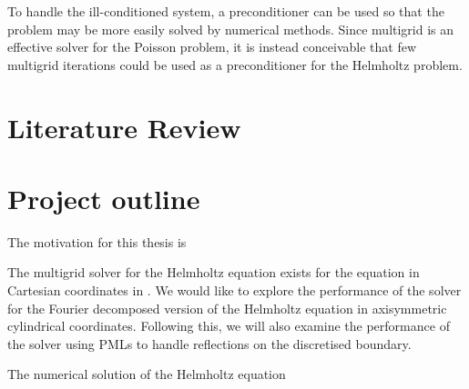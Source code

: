 To handle the ill-conditioned system, a preconditioner can be used so that the problem may be more easily solved by numerical methods.
Since multigrid is an effective solver for the Poisson problem, it is instead conceivable that few multigrid iterations could be used as a preconditioner for the Helmholtz problem.



\section{Literature Review}







\section{Project outline}

\iffalse
What is each chapter doing? What do we hope to accomplish? 
\fi

The motivation for this thesis is 

The multigrid solver for the Helmholtz equation exists for the equation in Cartesian coordinates in \oomph.
We would like to explore the performance of the solver for the Fourier decomposed version of the Helmholtz equation in axisymmetric cylindrical coordinates.
Following this, we will also examine the performance of the solver using PMLs to handle reflections on the discretised boundary.

The numerical solution of the Helmholtz equation 
